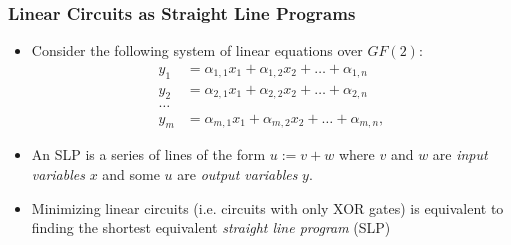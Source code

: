 \documentclass[10pt]{beamer}
\begin{document}
\begin{frame}
	\frametitle{Linear Circuits as Straight Line Programs}
	\begin{itemize}
		\item Consider the following system of linear equations over $GF(2)$:
\begin{align*}
y_1 & = \alpha_{1,1}x_1 + \alpha_{1,2}x_2 + \dots + \alpha_{1,n} \\
y_2 & = \alpha_{2,1}x_1 + \alpha_{2,2}x_2 + \dots + \alpha_{2,n} \\
\dots \\
y_m & = \alpha_{m,1}x_1 + \alpha_{m,2}x_2 + \dots + \alpha_{m,n},
\end{align*}
		\item An SLP is a series of lines of the form $u := v + w$ where $v$ and $w$ are \emph{input variables} $x$ and some $u$ are \emph{output variables} $y$.
		\item Minimizing linear circuits (i.e. circuits with only XOR gates) is equivalent to finding the shortest equivalent \emph{straight line program} (SLP)
	\end{itemize}
\end{frame}
\end{document}
